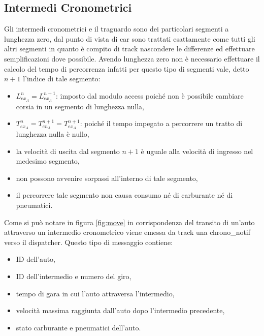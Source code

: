 \documentclass[11pt,a4paper]{report}
\begin{document}
\subsection{Intermedi Cronometrici}
Gli intermedi cronometrici e il traguardo sono dei particolari segmenti a lunghezza zero, dal punto di vista di car sono trattati esattamente come tutti gli altri segmenti in quanto è compito di track nascondere le differenze ed effettuare semplificazioni dove possibile. Avendo lunghezza zero non è necessario effettuare il calcolo del tempo di percorrenza infatti per questo tipo di segmenti vale, detto $n+1$ l'indice di tale segmento:
\begin{itemize}
\item $L_{ex_A}^{n} = L_{ex_A}^{n+1}$: imposto dal modulo access poiché non è possibile cambiare corsia in un segmento di lunghezza nulla,
\item $T_{ex_A}^{n} = T_{en_A}^{n+1} = T_{ex_A}^{n+1}$: poiché il tempo impegato a percorrere un tratto di lunghezza nulla è nullo,
\item la velocità di uscita dal segmento $n+1$ è uguale alla velocità di ingresso nel medesimo segmento,
\item non possono avvenire sorpassi all'interno di tale segmento,
\item il percorrere tale segmento non causa consumo né di carburante né di pneumatici.
\end{itemize}
Come si può notare in figura \ref{fig:move} in corrispondenza del transito di un'auto attraverso un intermedio cronometrico viene emessa da track una chrono\_notif verso il dispatcher. Questo tipo di messaggio contiene:
\begin{itemize}
\item ID dell'auto,
\item ID dell'intermedio e numero del giro,
\item tempo di gara in cui l'auto attraversa l'intermedio,
\item velocità massima raggiunta dall'auto dopo l'intermedio precedente,
\item stato carburante e pneumatici dell'auto.
\end{itemize}
\end{document}
